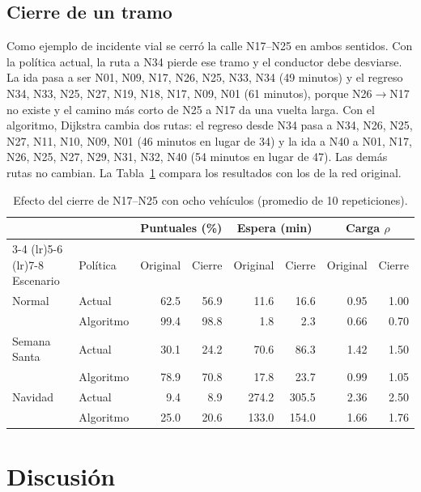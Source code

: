 \documentclass[11pt,letterpaper]{article}
\begin{document}
\subsection{Cierre de un tramo}

Como ejemplo de incidente vial se cerró la calle N17--N25 en ambos sentidos. Con la política actual, la ruta a N34 pierde ese tramo y el conductor debe desviarse. La ida pasa a ser N01, N09, N17, N26, N25, N33, N34 (49 minutos) y el regreso N34, N33, N25, N27, N19, N18, N17, N09, N01 (61 minutos), porque N26$\rightarrow$N17 no existe y el camino más corto de N25 a N17 da una vuelta larga. Con el algoritmo, Dijkstra cambia dos rutas: el regreso desde N34 pasa a N34, N26, N25, N27, N11, N10, N09, N01 (46 minutos en lugar de 34) y la ida a N40 a N01, N17, N26, N25, N27, N29, N31, N32, N40 (54 minutos en lugar de 47). Las demás rutas no cambian. La Tabla~\ref{tab:cierre} compara los resultados con los de la red original.

\begin{table}[htbp]
  \centering
  \small
  \caption{Efecto del cierre de N17--N25 con ocho vehículos (promedio de 10 repeticiones).}
  \label{tab:cierre}
  \begin{tabular}{l l rr rr rr}
    \toprule
    & & \multicolumn{2}{c}{Puntuales (\%)} & \multicolumn{2}{c}{Espera (min)} & \multicolumn{2}{c}{Carga $\rho$} \\
    \cmidrule(lr){3-4} \cmidrule(lr){5-6} \cmidrule(lr){7-8}
    Escenario & Política & Original & Cierre & Original & Cierre & Original & Cierre \\
    \midrule
    Normal & Actual & 62.5 & 56.9 & 11.6 & 16.6 & 0.95 & 1.00 \\
           & Algoritmo & 99.4 & 98.8 & 1.8 & 2.3 & 0.66 & 0.70 \\
    Semana Santa & Actual & 30.1 & 24.2 & 70.6 & 86.3 & 1.42 & 1.50 \\
           & Algoritmo & 78.9 & 70.8 & 17.8 & 23.7 & 0.99 & 1.05 \\
    Navidad & Actual & 9.4 & 8.9 & 274.2 & 305.5 & 2.36 & 2.50 \\
           & Algoritmo & 25.0 & 20.6 & 133.0 & 154.0 & 1.66 & 1.76 \\
    \bottomrule
  \end{tabular}
\end{table}

\section{Discusión}
\end{document}
